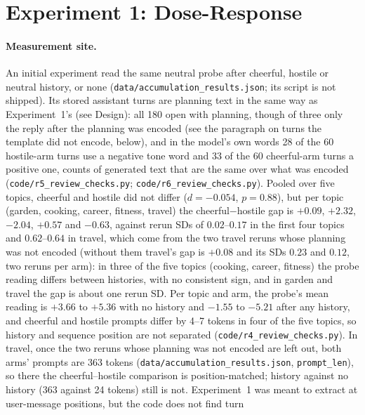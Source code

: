 \documentclass[11pt,a4paper]{article}
\begin{document}
\section{Experiment 1: Dose-Response}
\label{sec:dose}

\paragraph{Measurement site.} An initial experiment read the same
neutral probe after cheerful, hostile or neutral history, or none
(\texttt{data/accumulation\_results.json}; its script is not shipped).
Its stored assistant turns are planning text in the same way as
Experiment~1's (see Design): all 180 open with planning, though of three only the reply after the planning was encoded (see the paragraph on turns the template did not encode, below), and in the model's own words 28 of the 60 hostile-arm turns use a negative tone word and 33 of the 60 cheerful-arm turns a positive one, counts of generated text that are the same over what was encoded (\texttt{code/r5\_review\_checks.py}; \texttt{code/r6\_review\_checks.py}).
Pooled over five topics, cheerful and hostile did not differ
($d{=}-0.054$, $p{=}0.88$), but per topic (garden, cooking, career,
fitness, travel) the cheerful$-$hostile gap is $+0.09$, $+2.32$, $-2.04$,
$+0.57$ and $-0.63$, against rerun SDs of $0.02$--$0.17$ in the first four
topics and $0.62$--$0.64$ in travel, which come from the two travel reruns whose planning was not encoded (without them travel's gap is $+0.08$ and its SDs $0.23$ and $0.12$, two reruns per arm): in three of the five topics (cooking,
career, fitness) the probe reading differs between histories, with no
consistent sign, and in garden and travel the gap is about one rerun SD.
Per topic and arm, the probe's mean reading is $+3.66$ to $+5.36$
with no history and $-1.55$ to $-5.21$ after any history, and cheerful and
hostile prompts differ by 4--7 tokens in four of the five topics, so
history and sequence position are not separated
(\texttt{code/r4\_review\_checks.py}). In travel, once the two reruns
whose planning was not encoded are left out, both arms' prompts are 363
tokens (\texttt{data/accumulation\_results.json}, \texttt{prompt\_len}),
so there the cheerful--hostile comparison is position-matched; history
against no history (363 against 24 tokens) still is not. Experiment~1 was meant to
extract at user-message positions, but the code does not find turn
\end{document}
